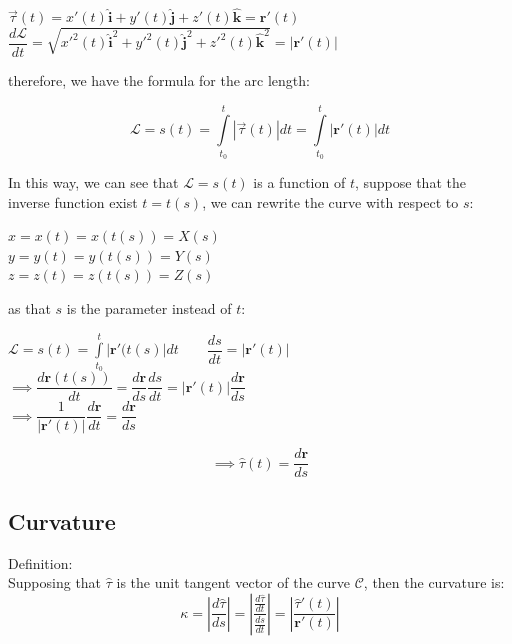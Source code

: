 \documentclass[UTF8,a4paper, 10pt, openany]{book}
\begin{document}
\begin{center}
$\overrightarrow{\tau }(t)=x'(t)\mathbf{\hat{i}}+y'(t)\mathbf{\hat{j}}+z'(t)\mathbf{\hat{k}}=\mathbf{r}'(t)$\\
$\dfrac{d\mathcal{L}}{dt}=\sqrt{x'^2(t)\mathbf{\hat{i}}^2+y'^2(t)\mathbf{\hat{j}}^2+z'^2(t)\mathbf{\hat{k}}^2}=|\mathbf{r}'(t)|$
\end{center}

therefore, we have the formula for the arc length:

\begin{equation}
\boxed{\mathcal{L}=s(t)=\displaystyle\int\limits_{t_0}^t|\overrightarrow{\tau }(t)|dt=\displaystyle\int\limits_{t_0}^t|\mathbf{r}'(t)|dt}
\end{equation}

In this way, we can see that $\mathcal{L}=s(t)$ is a function of $t$, suppose that the inverse function exist $t=t(s)$, we can rewrite the curve with respect to $s$:
\begin{center}
$x=x(t)=x(t(s))=X(s)$\\
$y=y(t)=y(t(s))=Y(s)$\\
$z=z(t)=z(t(s))=Z(s)$
\end{center}
as that $s$ is the parameter instead of $t$:
\begin{center}
$\mathcal{L}=s(t)=\displaystyle\int\limits_{t_0}^t|\mathbf{r}'(t(s)|dt \qquad \dfrac{ds}{dt}=|\mathbf{r}'(t)|$\\
$\implies \dfrac{d\mathbf{r}(t(s))}{dt}=\dfrac{d\mathbf{r}}{ds}\dfrac{ds}{dt}=|\mathbf{r}'(t)|\dfrac{d\mathbf{r}}{ds}$\\
$\implies \dfrac{1}{|\mathbf{r}'(t)|}\dfrac{d\mathbf{r}}{dt}=\dfrac{d\mathbf{r}}{ds}$\\
\end{center}
\begin{equation}
\boxed{\implies \hat{\tau}(t)=\dfrac{d\mathbf{r}}{ds}}
\end{equation}
\subsection{Curvature}
Definition:\\
Supposing that $\hat{\tau}$ is the unit tangent vector of the curve $\mathcal{C}$, then the curvature is:
\begin{equation}
\boxed{		\kappa=\left| \dfrac{d\hat{\tau}}{ds} \right|	=	\left|\dfrac{\frac{d\hat{\tau}}{dt}}{\frac{ds}{dt}}\right|	=	\left|\dfrac{\hat{\tau}'(t)}{\mathbf{r}'(t)}\right|	}
\end{equation}
\end{document}
